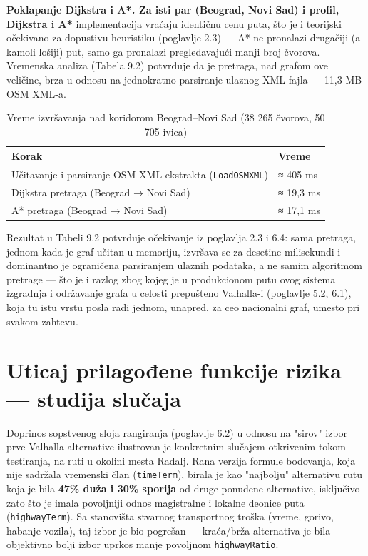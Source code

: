 \textbf{Poklapanje Dijkstra i A*\emph{.} Za isti par (Beograd, Novi Sad) i profil, Dijkstra i A*} implementacija vraćaju identičnu cenu puta, što je i teorijski očekivano za dopustivu heuristiku (poglavlje 2.3) — A* ne pronalazi drugačiji (a kamoli lošiji) put, samo ga pronalazi pregledavajući manji broj čvorova. Vremenska analiza (Tabela 9.2) potvrđuje da je pretraga, nad grafom ove veličine, brza u odnosu na jednokratno parsiranje ulaznog XML fajla — 11,3 MB OSM XML-a.

\setlength{\tabcolsep}{4pt}
\renewcommand{\arraystretch}{1.3}

\begin{longtable}{@{}|>{\small\raggedright\arraybackslash}p{}|>{\small\centering\arraybackslash}p{}|@{}}
\caption{Vreme izvršavanja nad koridorom Beograd–Novi Sad (38 265 čvorova, 50 705 ivica)}\label{tab:9-2}\\
\hline
\rowcolor{black!12}
\textbf{Korak} & \textbf{Vreme} \\
\hline
\endhead
Učitavanje i parsiranje OSM XML ekstrakta (\texttt{LoadOSMXML}) & ≈ 405 ms \\
\hline
Dijkstra pretraga (Beograd → Novi Sad) & ≈ 19,3 ms \\
\hline
A* pretraga (Beograd → Novi Sad) & ≈ 17,1 ms \\
\hline
\end{longtable}

\setlength{\tabcolsep}{6pt}

Rezultat u Tabeli 9.2 potvrđuje očekivanje iz poglavlja 2.3 i 6.4: sama pretraga, jednom kada je graf učitan u memoriju, izvršava se za desetine milisekundi i dominantno je ograničena parsiranjem ulaznih podataka, a ne samim algoritmom pretrage — što je i razlog zbog kojeg je u produkcionom putu ovog sistema izgradnja i održavanje grafa u celosti prepušteno Valhalla-i (poglavlje 5.2, 6.1), koja tu istu vrstu posla radi jednom, unapred, za ceo nacionalni graf, umesto pri svakom zahtevu.

\section{Uticaj prilagođene funkcije rizika — studija slučaja}

Doprinos sopstvenog sloja rangiranja (poglavlje 6.2) u odnosu na "sirov" izbor prve Valhalla alternative ilustrovan je konkretnim slučajem otkrivenim tokom testiranja, na ruti u okolini mesta Radalj. Rana verzija formule bodovanja, koja nije sadržala vremenski član (\texttt{timeTerm}), birala je kao "najbolju" alternativu rutu koja je bila \textbf{47\% duža i 30\% sporija} od druge ponuđene alternative, isključivo zato što je imala povoljniji odnos magistralne i lokalne deonice puta (\texttt{highwayTerm}). Sa stanovišta stvarnog transportnog troška (vreme, gorivo, habanje vozila), taj izbor je bio pogrešan — kraća/brža alternativa je bila objektivno bolji izbor uprkos manje povoljnom \texttt{highwayRatio}.

